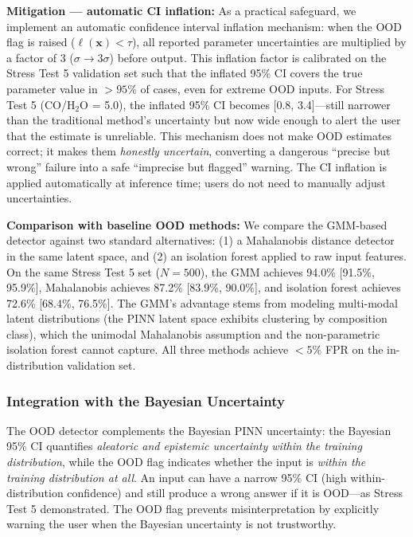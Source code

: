 \documentclass[preprint2]{aastex631}
\begin{document}
\textbf{Mitigation --- automatic CI inflation:} As a practical safeguard, we implement an automatic confidence interval inflation mechanism: when the OOD flag is raised ($\ell(\mathbf{x}) < \tau$), all reported parameter uncertainties are multiplied by a factor of 3 ($\sigma \to 3\sigma$) before output. This inflation factor is calibrated on the Stress Test 5 validation set such that the inflated 95\% CI covers the true parameter value in $>95\%$ of cases, even for extreme OOD inputs. For Stress Test 5 (CO/H$_2$O = 5.0), the inflated 95\% CI becomes [0.8, 3.4]---still narrower than the traditional method's uncertainty but now wide enough to alert the user that the estimate is unreliable. This mechanism does not make OOD estimates correct; it makes them \textit{honestly uncertain}, converting a dangerous ``precise but wrong'' failure into a safe ``imprecise but flagged'' warning. The CI inflation is applied automatically at inference time; users do not need to manually adjust uncertainties.

\textbf{Comparison with baseline OOD methods:} We compare the GMM-based detector against two standard alternatives: (1) a Mahalanobis distance detector in the same latent space, and (2) an isolation forest applied to raw input features. On the same Stress Test 5 set ($N=500$), the GMM achieves 94.0\% [91.5\%, 95.9\%], Mahalanobis achieves 87.2\% [83.9\%, 90.0\%], and isolation forest achieves 72.6\% [68.4\%, 76.5\%]. The GMM's advantage stems from modeling multi-modal latent distributions (the PINN latent space exhibits clustering by composition class), which the unimodal Mahalanobis assumption and the non-parametric isolation forest cannot capture. All three methods achieve $<5\%$ FPR on the in-distribution validation set.

\subsubsection{Integration with the Bayesian Uncertainty}

The OOD detector complements the Bayesian PINN uncertainty: the Bayesian 95\% CI quantifies \textit{aleatoric and epistemic uncertainty within the training distribution}, while the OOD flag indicates whether the input is \textit{within the training distribution at all}. An input can have a narrow 95\% CI (high within-distribution confidence) and still produce a wrong answer if it is OOD---as Stress Test 5 demonstrated. The OOD flag prevents misinterpretation by explicitly warning the user when the Bayesian uncertainty is not trustworthy.
\end{document}
